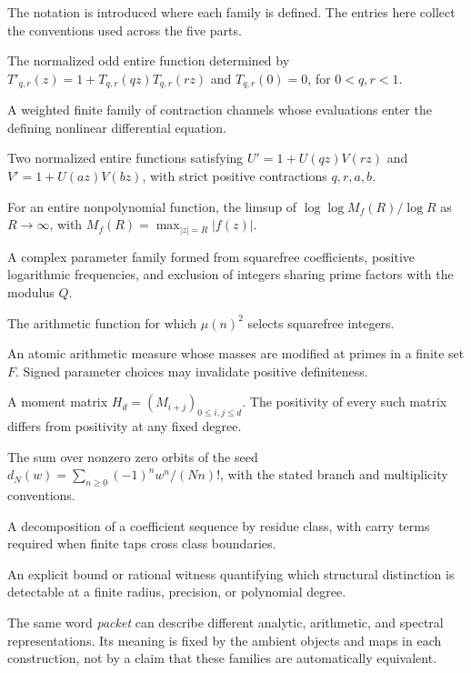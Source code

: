 The notation is introduced where each family is defined. The entries here collect the conventions used across the five parts.

\begin{description}
\setlength{\itemsep}{7pt}
\item[Contracted feedback $T_{q,r}$.] The normalized odd entire function determined by $T'_{q,r}(z)=1+T_{q,r}(qz)T_{q,r}(rz)$ and $T_{q,r}(0)=0$, for $0<q,r<1$.
\item[Feedback bank $F_{\Theta}$.] A weighted finite family of contraction channels whose evaluations enter the defining nonlinear differential equation.
\item[Coupled pair $(U,V)$.] Two normalized entire functions satisfying $U'=1+U(qz)V(rz)$ and $V'=1+U(az)V(bz)$, with strict positive contractions $q,r,a,b$.
\item[Entire order $\rho(f)$.] For an entire nonpolynomial function, the limsup of $\log\log M_f(R)/\log R$ as $R\to\infty$, with $M_f(R)=\max_{|z|=R}|f(z)|$.
\item[Arithmetic depth $A_{a,\beta,Q}$.] A complex parameter family formed from squarefree coefficients, positive logarithmic frequencies, and exclusion of integers sharing prime factors with the modulus $Q$.
\item[M\"obius function $\mu$.] The arithmetic function for which $\mu(n)^2$ selects squarefree integers.
\item[Prime-sieve measure $\nu_{F,\boldsymbol\lambda}$.] An atomic arithmetic measure whose masses are modified at primes in a finite set $F$. Signed parameter choices may invalidate positive definiteness.
\item[Hankel matrix.] A moment matrix $H_d=(M_{i+j})_{0\le i,j\le d}$. The positivity of every such matrix differs from positivity at any fixed degree.
\item[Orbit spectral zeta $\mathcal Z_N$.] The sum over nonzero zero orbits of the seed $d_N(w)=\sum_{n\ge0}(-1)^nw^n/(Nn)!$, with the stated branch and multiplicity conventions.
\item[Polyphase section.] A decomposition of a coefficient sequence by residue class, with carry terms required when finite taps cross class boundaries.
\item[Resolution certificate.] An explicit bound or rational witness quantifying which structural distinction is detectable at a finite radius, precision, or polynomial degree.
\end{description}

The same word \emph{packet} can describe different analytic, arithmetic, and spectral representations. Its meaning is fixed by the ambient objects and maps in each construction, not by a claim that these families are automatically equivalent.
